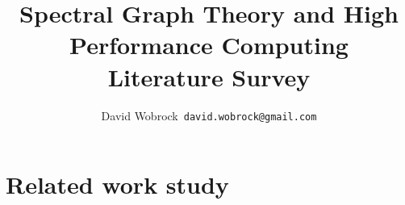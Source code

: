 \documentclass[]{article}
\title{Spectral Graph Theory and High Performance Computing \\ Literature Survey}
\author{David Wobrock\ \texttt{david.wobrock@gmail.com}}
\begin{document}
\maketitle

\section{Related work study}



\clearpage
\printbibliography
\end{document}
